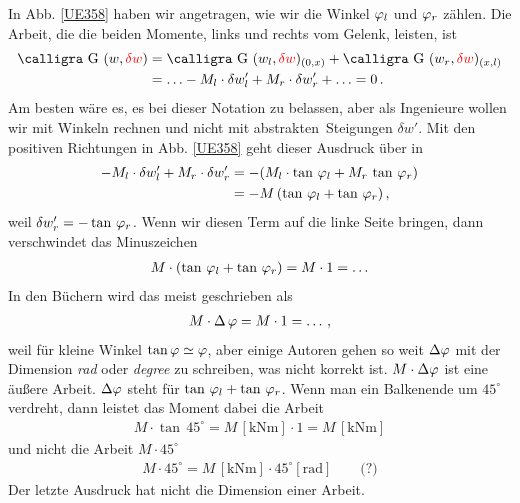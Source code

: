 {{{{{\begin{remark}
In Abb. \ref{UE358} haben wir angetragen, wie wir die Winkel $\varphi_l$ und $\varphi_r$ z\"{a}hlen. Die Arbeit, die die beiden Momente, links und rechts vom Gelenk, leisten, ist
\begin{align}
\text{\normalfont\calligra G\,\,}(w, \textcolor{red}{\delta w}) &= \text{\normalfont\calligra G\,\,}(w_l, \textcolor{red}{\delta w})_{(0,{x})}+  \text{\normalfont\calligra G\,\,}(w_r, \textcolor{red}{\delta w})_{({x},l)} \nn\\
&= \ldots - M_l \cdot \delta w'_l + M_r \cdot \delta w'_r + \ldots = 0\,.
\end{align}
Am besten w\"{a}re es, es bei dieser Notation zu belassen, aber als Ingenieure wollen wir mit Winkeln rechnen und nicht mit \glq abstrakten\grq\ Steigungen $\delta w'$. Mit den positiven Richtungen in Abb.  \ref{UE358} geht dieser Ausdruck \"{u}ber in
\begin{align}
- M_l \cdot \delta w'_l + M_r \cdot \delta w'_r &= - (M_l \cdot \tan\,\varphi_l + M_r\,\tan\,\varphi_r)\nonumber \\
&= - M \,(\tan\,\varphi_l + \tan\,\varphi_r)\,,
\end{align}
weil $\delta w_r' = - \tan\,\varphi_r$. Wenn wir diesen Term auf die linke Seite bringen, dann verschwindet das Minuszeichen
\begin{align}
M \cdot (\tan\,\varphi_l + \tan\,\varphi_r) = M \cdot 1 = \ldots
\end{align}
In den B\"{u}chern wird das meist geschrieben als
\begin{align}
M \cdot \Delta\,\varphi = M \cdot 1 = \ldots\,,
\end{align}
weil f\"{u}r kleine  Winkel $\tan \varphi \simeq \varphi$, aber einige Autoren gehen so weit $\Delta \varphi$ mit der Dimension {\em rad\/} oder {\em degree\/} zu schreiben, was nicht korrekt ist. $M \cdot \Delta \varphi$ ist eine \"{a}u{\ss}ere Arbeit. $ \Delta \varphi$ steht f\"{u}r $\tan\,\varphi_l + \tan\,\varphi_r$. Wenn man ein Balkenende um $45^\circ$ verdreht, dann leistet das Moment dabei die Arbeit
\begin{align}
M \cdot \tan\,45^\circ = M\, [\text{kNm}] \cdot 1 = M  \,[\text{kNm}]
\end{align}
und nicht die Arbeit $M \cdot 45^\circ$
\begin{align}
M \cdot 45^\circ =  M\, [\text{kNm}] \cdot 45^\circ [\text{rad}] \qquad \text{(?)}
\end{align}
Der letzte Ausdruck hat nicht die Dimension einer Arbeit.
\end{remark}

}}}}}
